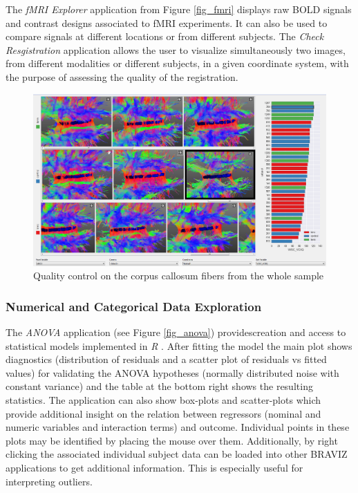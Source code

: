 \documentclass[twocolumn]{svjour3}
\begin{document}
The \emph{fMRI Explorer} application from Figure \ref{fig_fmri} displays raw BOLD signals and contrast designs associated to fMRI experiments. It can also be used to compare signals at different locations or from different subjects. The \emph{Check Resgistration} application allows the user to visualize simultaneously two images, from different modalities or different subjects, in a given coordinate system, with the purpose of assessing the quality of the registration.

\begin{figure}
\begin{center}
\includegraphics[width=\linewidth]{quality_control_trim}
\end{center}
 \caption{\label{fig_sample} Quality control on the corpus callosum fibers from the whole sample}
\end{figure}



\subsubsection{Numerical and Categorical Data Exploration}

The \emph{ANOVA} application (see Figure \ref{fig_anova}) providescreation and access to statistical models implemented in \emph{R} \cite{team_r:_2012}. After fitting the model the main plot shows diagnostics (distribution of residuals and a scatter plot of residuals vs fitted values) for validating the ANOVA hypotheses (normally distributed noise with constant variance) and the table at the bottom right shows the resulting statistics. The application can also show box-plots and scatter-plots which provide additional insight on the relation between regressors (nominal and numeric variables and interaction terms) and outcome. Individual points in these plots may be identified by placing the mouse over them. Additionally, by right clicking the associated individual subject data can be loaded into other BRAVIZ applications to get additional information. This is especially useful for interpreting outliers.
\end{document}

